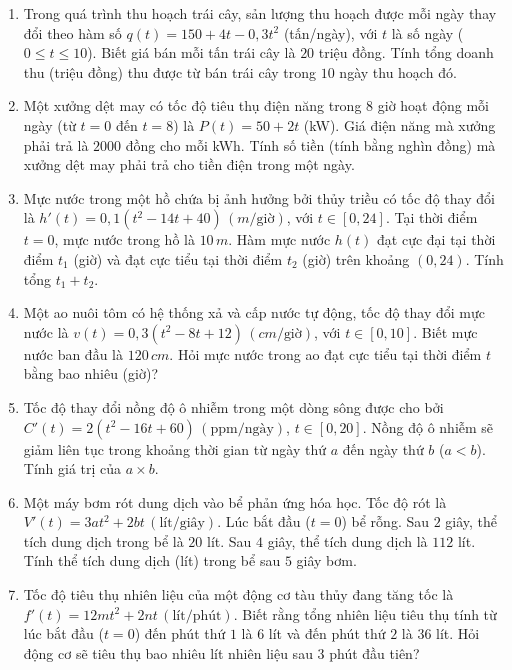 \documentclass[12pt]{article}
\begin{document}
\begin{enumerate}[label=\textbf{Câu \arabic*.}, start=1]
		\item Trong quá trình thu hoạch trái cây, sản lượng thu hoạch được mỗi ngày thay đổi theo hàm số $q(t) = 150 + 4t - 0,3t^2$ (tấn/ngày), với $t$ là số ngày ($0 \le t \le 10$). Biết giá bán mỗi tấn trái cây là $20$ triệu đồng. Tính tổng doanh thu (triệu đồng) thu được từ bán trái cây trong $10$ ngày thu hoạch đó.
		\vspace{0.75cm}
		
		\item Một xưởng dệt may có tốc độ tiêu thụ điện năng trong $8$ giờ hoạt động mỗi ngày (từ $t=0$ đến $t=8$) là $P(t) = 50 + 2t$ (kW). Giá điện năng mà xưởng phải trả là $2000$ đồng cho mỗi kWh. Tính số tiền (tính bằng nghìn đồng) mà xưởng dệt may phải trả cho tiền điện trong một ngày.
		\vspace{0.75cm}
		
		\item Mực nước trong một hồ chứa bị ảnh hưởng bởi thủy triều có tốc độ thay đổi là $h'(t) = 0,1(t^2 - 14t + 40) \, (m/\text{giờ})$, với $t \in [0, 24]$. Tại thời điểm $t = 0$, mực nước trong hồ là $10 \, m$. Hàm mực nước $h(t)$ đạt cực đại tại thời điểm $t_1$ (giờ) và đạt cực tiểu tại thời điểm $t_2$ (giờ) trên khoảng $(0, 24)$. Tính tổng $t_1 + t_2$.
		\vspace{0.75cm}
		
		\item Một ao nuôi tôm có hệ thống xả và cấp nước tự động, tốc độ thay đổi mực nước là $v(t) = 0,3(t^2 - 8t + 12) \, (cm/\text{giờ})$, với $t \in [0, 10]$. Biết mực nước ban đầu là $120 \, cm$. Hỏi mực nước trong ao đạt cực tiểu tại thời điểm $t$ bằng bao nhiêu (giờ)?
		\vspace{0.75cm}
		
		\item Tốc độ thay đổi nồng độ ô nhiễm trong một dòng sông được cho bởi $C'(t) = 2(t^2 - 16t + 60) \, (\text{ppm/ngày})$, $t \in [0, 20]$. Nồng độ ô nhiễm sẽ giảm liên tục trong khoảng thời gian từ ngày thứ $a$ đến ngày thứ $b$ ($a < b$). Tính giá trị của $a \times b$.
		\vspace{0.75cm}
		
		\item Một máy bơm rót dung dịch vào bể phản ứng hóa học. Tốc độ rót là $V'(t) = 3at^2 + 2bt \, (\text{lít/giây})$. Lúc bắt đầu ($t=0$) bể rỗng. Sau $2$ giây, thể tích dung dịch trong bể là $20$ lít. Sau $4$ giây, thể tích dung dịch là $112$ lít. Tính thể tích dung dịch (lít) trong bể sau $5$ giây bơm.
		\vspace{0.75cm}
		
		\item Tốc độ tiêu thụ nhiên liệu của một động cơ tàu thủy đang tăng tốc là $f'(t) = 12mt^2 + 2nt \, (\text{lít/phút})$. Biết rằng tổng nhiên liệu tiêu thụ tính từ lúc bắt đầu ($t=0$) đến phút thứ $1$ là $6$ lít và đến phút thứ $2$ là $36$ lít. Hỏi động cơ sẽ tiêu thụ bao nhiêu lít nhiên liệu sau $3$ phút đầu tiên?
		\vspace{0.75cm}
		
	\end{enumerate}
	
\end{document}

